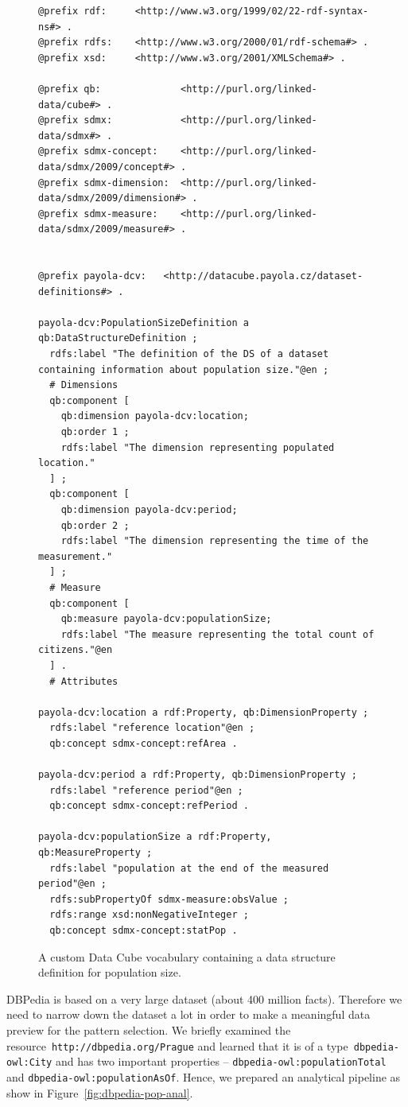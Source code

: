 \begin{figure}
  \scriptsize
  \begin{verbatim}
@prefix rdf:     <http://www.w3.org/1999/02/22-rdf-syntax-ns#> .
@prefix rdfs:    <http://www.w3.org/2000/01/rdf-schema#> .
@prefix xsd:     <http://www.w3.org/2001/XMLSchema#> .

@prefix qb:              <http://purl.org/linked-data/cube#> .
@prefix sdmx:            <http://purl.org/linked-data/sdmx#> .
@prefix sdmx-concept:    <http://purl.org/linked-data/sdmx/2009/concept#> .
@prefix sdmx-dimension:  <http://purl.org/linked-data/sdmx/2009/dimension#> .
@prefix sdmx-measure:    <http://purl.org/linked-data/sdmx/2009/measure#> .


@prefix payola-dcv:   <http://datacube.payola.cz/dataset-definitions#> .

payola-dcv:PopulationSizeDefinition a qb:DataStructureDefinition ;
  rdfs:label "The definition of the DS of a dataset containing information about population size."@en ;
  # Dimensions
  qb:component [
    qb:dimension payola-dcv:location;
    qb:order 1 ;
    rdfs:label "The dimension representing populated location."
  ] ;
  qb:component [	
    qb:dimension payola-dcv:period;
    qb:order 2 ;
    rdfs:label "The dimension representing the time of the measurement."
  ] ;
  # Measure
  qb:component [
    qb:measure payola-dcv:populationSize;
    rdfs:label "The measure representing the total count of citizens."@en
  ] .
  # Attributes

payola-dcv:location a rdf:Property, qb:DimensionProperty ;
  rdfs:label "reference location"@en ;
  qb:concept sdmx-concept:refArea .

payola-dcv:period a rdf:Property, qb:DimensionProperty ;
  rdfs:label "reference period"@en ;
  qb:concept sdmx-concept:refPeriod .

payola-dcv:populationSize a rdf:Property, qb:MeasureProperty ;
  rdfs:label "population at the end of the measured period"@en ;
  rdfs:subPropertyOf sdmx-measure:obsValue ;
  rdfs:range xsd:nonNegativeInteger ;
  qb:concept sdmx-concept:statPop .
  \end{verbatim}
  \caption{A custom Data Cube vocabulary containing a data structure definition for population size.}
  \label{fig:dcv-dbpedia-dsd}
\end{figure}

\begin{sloppypar}
DBPedia is based on a very large dataset (about 400 million facts). Therefore we 
need to narrow down the dataset a lot in order to make a meaningful data preview for 
the
pattern selection. We briefly examined the resource~\texttt{http://dbpedia.org/Prague} 
and learned that it is of a type~\texttt{dbpedia-owl:City} and has two 
important properties -- \texttt{dbpedia-owl:populationTotal} and 
\texttt{dbpedia-owl:populationAsOf}. Hence, we prepared an analytical pipeline 
as show in Figure~\ref{fig:dbpedia-pop-anal}.
\end{sloppypar}

